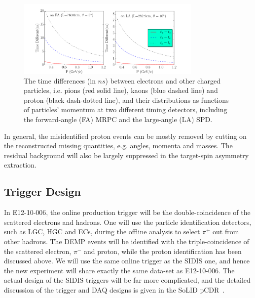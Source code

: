 \begin{figure}[!ht]
 \begin{center}
  \includegraphics[width=0.8\textwidth]{./figures/time_diff.pdf}
   \caption[Time-of-time]{\footnotesize{The time differences (in $ns$) between
       electrons and other charged particles, i.e. pions (red solid line),
       kaons (blue dashed line) and proton (black dash-dotted line), and their
       distributions as functions of particles' momentum at two different
       timing detectors, including the forward-angle (FA) MRPC and the large-angle
       (LA) SPD.}}
   \label{tof_diff}
 \end{center}
\end{figure}

In general, the misidentified proton events can be mostly removed by cutting on the
reconstructed missing quantities, e.g. angles, momenta and masses. The residual
background will also be largely suppressed in the target-spin asymmetry
extraction.

\subsection{Trigger Design}

In E12-10-006, the online production trigger will be the double-coincidence of
the scattered electrons and hadrons. One will use the particle identification
detectors, such as LGC, HGC and ECs, during the offline analysis to select
$\pi^{\pm}$ out from other hadrons. The DEMP events will be identified with the
triple-coincidence of the scattered electron, $\pi^{-}$ and proton, while the
proton identification has been discussed above. We will use the same online
trigger as the SIDIS one, and hence the new experiment will share exactly the same
data-set as E12-10-006. The actual design of the SIDIS triggers will be far
more complicated, and the detailed discussion of the trigger and DAQ designs is
given in the SoLID pCDR~\cite{solid_pcdr}.

